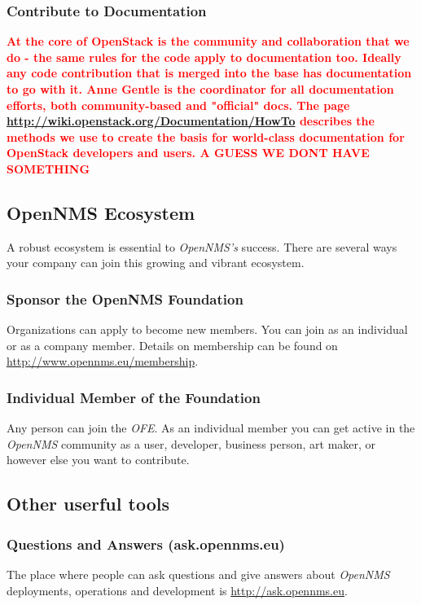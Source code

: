 \subsubsection{Contribute to Documentation}
\textbf{\textcolor{red}{At the core of OpenStack is the community and collaboration that we do - the same rules for the code apply to documentation too. Ideally any code contribution that is merged into the base has documentation to go with it. Anne Gentle is the coordinator for all documentation efforts, both community-based and "official" docs. The page \url{http://wiki.openstack.org/Documentation/HowTo} describes the methods we use to create the basis for world-class documentation for OpenStack developers and users. A GUESS WE DONT HAVE SOMETHING}}

\subsection{OpenNMS Ecosystem}
A robust ecosystem is essential to \emph{OpenNMS’s} success. There are several ways your company can join this growing and vibrant ecosystem.

\subsubsection{Sponsor the OpenNMS Foundation}
Organizations can apply to become new members. You can join as an individual or as a company member. Details on membership can be found on \url{http://www.opennms.eu/membership}.

\subsubsection{Individual Member of the Foundation}
Any person can join the \emph{OFE}. As an individual member you can get active in the \emph{OpenNMS} community as a user, developer, business person, art maker, or however else you want to contribute.


\subsection{Other userful tools}

\subsubsection{Questions and Answers (ask.opennms.eu)}
The place where people can ask questions and give answers about \emph{OpenNMS} deployments, operations and development is \url{http://ask.opennms.eu}.

